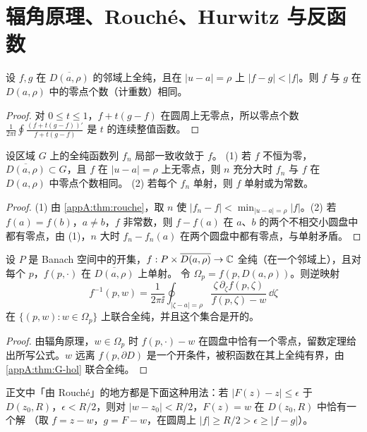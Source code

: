 \section{辐角原理、Rouché、Hurwitz 与反函数}\label{appA:sec:rouche}

\begin{theorem}[Rouché]\label{appA:thm:rouche}
设 $f,g$ 在 $\overline{D(a,\rho)}$ 的邻域上全纯，且在 $|u-a|=\rho$ 上 $|f-g|<|f|$。则 $f$ 与 $g$ 在 $D(a,\rho)$ 中的零点个数（计重数）相同。
\end{theorem}

\begin{proof}
对 $0\le t\le1$，$f+t(g-f)$ 在圆周上无零点，所以零点个数 $\frac1{2\pi\ii}\oint\frac{(f+t(g-f))'}{f+t(g-f)}$ 是 $t$ 的连续整值函数。
\end{proof}

\begin{theorem}[Hurwitz]\label{appA:thm:hurwitz}
设区域 $G$ 上的全纯函数列 $f_n$ 局部一致收敛于 $f$。
(1) 若 $f$ 不恒为零，$\overline{D(a,\rho)}\subset G$，且 $f$ 在 $|u-a|=\rho$ 上无零点，则 $n$ 充分大时 $f_n$ 与 $f$ 在 $D(a,\rho)$ 中零点个数相同。
(2) 若每个 $f_n$ 单射，则 $f$ 单射或为常数。
\end{theorem}

\begin{proof}
(1) 由 \cref{appA:thm:rouche}，取 $n$ 使 $|f_n-f|<\min_{|u-a|=\rho}|f|$。(2) 若 $f(a)=f(b)$，$a\neq b$，$f$ 非常数，则 $f-f(a)$ 在 $a$、$b$ 的两个不相交小圆盘中都有零点，由 (1)，$n$ 大时 $f_n-f_n(a)$ 在两个圆盘中都有零点，与单射矛盾。
\end{proof}

\begin{proposition}[带参数的反函数]\label{appA:prop:inverse}
设 $P$ 是 Banach 空间中的开集，$f:P\times\overline{D(a,\rho)}\to\mathbb{C}$ 全纯（在一个邻域上），且对每个 $p$，$f(p,\cdot)$ 在 $\overline{D(a,\rho)}$ 上单射。
令 $\Omega_p=f(p,D(a,\rho))$。则逆映射
\[
  f^{-1}(p,w)=\frac1{2\pi\ii}\oint_{|\zeta-a|=\rho}\frac{\zeta\,\partial_\zeta f(p,\zeta)}{f(p,\zeta)-w}\,\dd\zeta
\]
在 $\{(p,w):w\in\Omega_p\}$ 上联合全纯，并且这个集合是开的。
\end{proposition}

\begin{proof}
由辐角原理，$w\in\Omega_p$ 时 $f(p,\cdot)-w$ 在圆盘中恰有一个零点，留数定理给出所写公式。$w$ 远离 $f(p,\partial D)$ 是一个开条件，被积函数在其上全纯有界，由 \cref{appA:thm:G-hol} 联合全纯。
\end{proof}

正文中「由 Rouché」的地方都是下面这种用法：若 $|F(z)-z|\le\epsilon$ 于 $D(z_0,R)$，$\epsilon<R/2$，则对 $|w-z_0|<R/2$，$F(z)=w$ 在 $D(z_0,R)$ 中恰有一个解
（取 $f=z-w$，$g=F-w$，在圆周上 $|f|\ge R/2>\epsilon\ge|f-g|$）。

